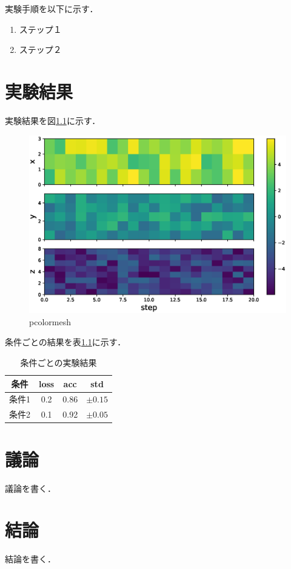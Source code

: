 \documentclass[a4paper, oneside, openany, dvipdfmx]{suribt}%
\newcommand{\fref}[1]{図\ref{#1}}
\newcommand{\tref}[1]{表\ref{#1}}
\begin{document}
実験手順を以下に示す．

\begin{enumerate}
  \item ステップ１
  \item ステップ２
\end{enumerate}


\chapter{実験結果}

実験結果を\fref{fig:pcolormesh}に示す．
\begin{figure}[h]
  \centering
  \includegraphics[width=0.9\linewidth]{figs/pcolormesh.eps}
  \caption{pcolormesh}
  \label{fig:pcolormesh}
\end{figure}

条件ごとの結果を\tref{tb:result}に示す．
\begin{table}[htbp]
  \caption{条件ごとの実験結果}
  \label{tb:result}
  \centering\begin{tabular}{c|ccc}\hline
    条件 & loss & acc & std\\\hline
    条件1 & 0.2 & 0.86 & $\pm 0.15$\\\hline
    条件2 & 0.1 & 0.92 & $\pm 0.05$\\\hline
  \end{tabular}
\end{table}

\chapter{議論}
議論を書く．

\chapter{結論}
結論を書く．
\end{document}
